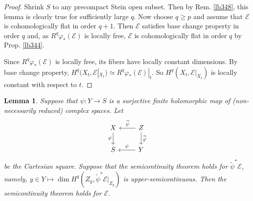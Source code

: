 \documentclass[12pt,b5paper,notitlepage]{report}
\theoremstyle{definition}
\theoremstyle{plain}
\newtheorem{lm}[df]{Lemma}
\newcommand{\wtd}{\widetilde}
\newcommand{\scr}{\mathscr}
\numberwithin{equation}{section}
\begin{document}
\begin{proof}
Shrink $S$ to any precompact Stein open subset. Then by Rem. \ref{lb348}, this lemma is clearly true for sufficiently large $q$. Now choose $q\geq p$ and assume that $\scr E$ is cohomologically flat in order $q+1$. Then $\scr E$ satisfies base change property in order $q$ and, as $R^q\varphi_*(\scr E)$ is locally free, $\scr E$ is cohomologically flat in order $q$ by Prop. \ref{lb344}.

Since $R^q\varphi_*(\scr E)$ is locally free, its fibers have locally constant dimensions. By base change property, $H^q(X_t,\scr E|_{X_t})\simeq R^q\varphi_*(\scr E)|_t$. So $H^q(X_t,\scr E|_{X_t})$ is locally constant with respect to $t$.
\end{proof}




\begin{lm}\label{lb353}
Suppose that $\psi:Y\rightarrow S$ is a surjective finite holomorphic map of (non-necessarily reduced) complex spaces. Let
\begin{equation*}
\begin{tikzcd}
X \arrow[d, "\varphi"'] & Z \arrow[l, "\wtd\psi"'] \arrow[d, "\wtd\varphi"] \\
S                       & Y \arrow[l, "\psi"']                             
\end{tikzcd}
\end{equation*}
be the Cartesian square. Suppose that the semicontinuity theorem holds for $\wtd\psi^*\scr E$, namely, $y\in Y\mapsto \dim H^q(Z_y,\wtd\psi^*\scr E|_{Z_y})$ is upper-semicontinuous. Then the semicontinuity theorem holds for $\scr E$.
\end{lm}
\end{document}
